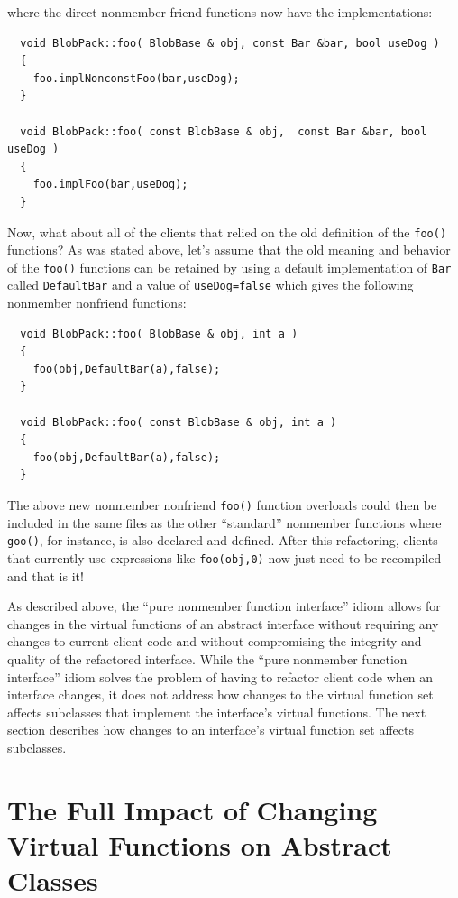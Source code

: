 \documentclass[pdf,ps2pdf,11pt]{SANDreport}
\begin{document}
{}\noindent{}where the direct nonmember friend functions now have the
implementations:

{\small\begin{verbatim}
  void BlobPack::foo( BlobBase & obj, const Bar &bar, bool useDog )
  {
    foo.implNonconstFoo(bar,useDog);
  }

  void BlobPack::foo( const BlobBase & obj,  const Bar &bar, bool useDog )
  {
    foo.implFoo(bar,useDog);
  }
\end{verbatim}}

Now, what about all of the clients that relied on the old definition of the
{}\texttt{foo()} functions?  As was stated above, let's assume that the old
meaning and behavior of the {}\texttt{foo()} functions can be retained by
using a default implementation of {}\texttt{Bar} called {}\texttt{DefaultBar}
and a value of {}\texttt{useDog=false} which gives the following nonmember
nonfriend functions:

{\small\begin{verbatim}
  void BlobPack::foo( BlobBase & obj, int a )
  {
    foo(obj,DefaultBar(a),false);
  }

  void BlobPack::foo( const BlobBase & obj, int a )
  {
    foo(obj,DefaultBar(a),false);
  }
\end{verbatim}}

The above new nonmember nonfriend {}\texttt{foo()} function overloads could
then be included in the same files as the other ``standard'' nonmember
functions where {}\texttt{goo()}, for instance, is also declared and defined.
After this refactoring, clients that currently use expressions like
{}\texttt{foo(obj,0)} now just need to be recompiled and that is it!

As described above, the ``pure nonmember function interface'' idiom allows for
changes in the virtual functions of an abstract interface without requiring
any changes to current client code and without compromising the integrity and
quality of the refactored interface.  While the ``pure nonmember function
interface'' idiom solves the problem of having to refactor client code when an
interface changes, it does not address how changes to the virtual function set
affects subclasses that implement the interface's virtual functions.  The next
section describes how changes to an interface's virtual function set affects
subclasses.

%
\section{The Full Impact of Changing Virtual Functions on Abstract Classes}
%
\end{document}
